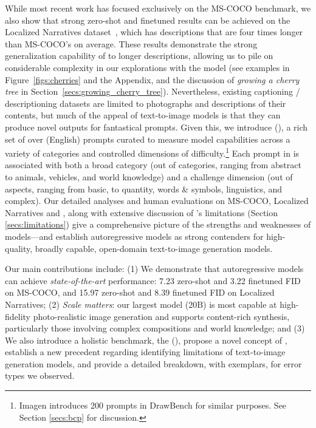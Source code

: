 While most recent work has focused exclusively on the MS-COCO benchmark, we also show that strong zero-shot and finetuned results can be achieved on the Localized Narratives dataset~\cite{PontTuset_eccv2020}, which has descriptions that are four times longer than MS-COCO's on average. These results demonstrate the strong generalization capability of \bdraw to longer descriptions, allowing us to pile on considerable complexity in our explorations with the model (see examples in Figure~\ref{figs:cherries} and the Appendix, and the discussion of \textit{growing a cherry tree} in Section~\ref{secs:growing_cherry_tree}). Nevertheless, existing captioning / descriptioning datasets are limited to photographs and descriptions of their contents, but much of the appeal of text-to-image models is that they can produce novel outputs for fantastical prompts. Given this, we introduce {\it \bcp{}} (\bcpa{}), a rich set of over \bcpsize{} (English) prompts curated to measure model capabilities across a variety of categories and controlled dimensions of difficulty.\footnote{Imagen \cite{imagen} introduces 200 prompts in DrawBench for similar purposes. See Section \ref{secs:bcp} for discussion.} Each prompt in \bcpa{} is associated with both a broad category (out of \bcpcat{} categories, ranging from abstract to animals, vehicles, and world knowledge) and a challenge dimension (out of \bcptrick{} aspects, ranging from basic, to quantity, words \& symbols, linguistics, and complex). Our detailed analyses and human evaluations on MS-COCO, Localized Narratives and \bcpa{}, along with extensive discussion of \bdraw's limitations (Section \ref{secs:limitations}) give a comprehensive picture of the strengths and weaknesses of \bdraw models---and establish autoregressive models as strong contenders for high-quality, broadly capable, open-domain text-to-image generation models.

Our main contributions include: (1) We demonstrate that autoregressive models can achieve {\it state-of-the-art} performance: 7.23 zero-shot and 3.22 finetuned FID on MS-COCO, and 15.97 zero-shot and 8.39 finetuned FID on Localized Narratives; (2) {\it Scale matters}: our largest \bdraw{} model (20B) is most capable at high-fidelity photo-realistic image generation and supports content-rich synthesis, particularly those involving complex compositions and world knowledge; and (3) We also introduce a holistic benchmark, the {\it \bcp{}} (\bcpa{}), propose a novel concept of {\it \cherry{}}, establish a new precedent regarding identifying limitations of text-to-image generation models, and provide a detailed breakdown, with exemplars, for error types we observed.